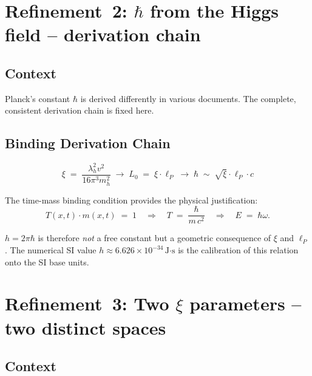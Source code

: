\section{\texorpdfstring{Refinement~2: $\hbar$ from the Higgs field -- derivation chain}{Refinement 2: hbar from the Higgs field -- derivation chain}}

\subsection*{Context}

Planck's constant $\hbar$ is derived differently in various documents.
The complete, consistent derivation chain is fixed here.

\subsection*{Binding Derivation Chain}

\begin{equation}
  \xi \;=\; \frac{\lambda_h^2 v^2}{16\pi^3 m_h^2}
  \;\longrightarrow\;
  L_0 \;=\; \xi \cdot \ell_P
  \;\longrightarrow\;
  \hbar \;\sim\; \sqrt{\xi}\cdot \ell_P \cdot c
  \tag{190.8}
\end{equation}

The time-mass binding condition provides the physical justification:
\begin{equation}
  T(x,t)\cdot m(x,t) \;=\; 1
  \quad\Longrightarrow\quad
  T \;=\; \frac{\hbar}{m\, c^2}
  \quad\Longrightarrow\quad
  E \;=\; \hbar\omega.
  \tag{190.9}
\end{equation}

$h = 2\pi\hbar$ is therefore \emph{not} a free constant but a
geometric consequence of $\xi$ and $\ell_P$. The numerical SI value
$h \approx 6.626 \times 10^{-34}\,\text{J·s}$ is the
calibration of this relation onto the SI base units.

\section{\texorpdfstring{Refinement~3: Two $\xi$ parameters -- two distinct spaces}{Refinement 3: Two xi parameters -- two distinct spaces}}

\subsection*{Context}

